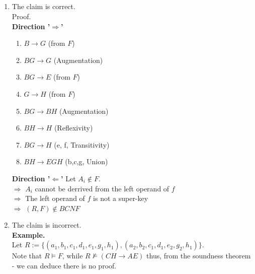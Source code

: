 \subsection{}
\begin{enumerate}
	\item
	The claim is correct.\\
		Proof.\\
		\textbf{Direction '$\Rightarrow$'}
		\begin{enumerate}
			\item $B\rightarrow G$ (from $F$)
			\item $BG\rightarrow G$ (Augmentation)
			\item $BG\rightarrow E$ (from $F$)
			\item $G\rightarrow H$ (from $F$)
			\item $BG\rightarrow BH$ (Augmentation)
			\item $BH\rightarrow H$ (Reflexivity)
			\item $BG\rightarrow H$ (e, f, Transitivity)
			\item $BH\rightarrow EGH$ (b,c,g, Union)
		\end{enumerate}
		\textbf{Direction '$\Leftarrow$'}
		Let $A_i\notin F$.\\
		$\Rightarrow$ $A_i$ cannot be derrived from the left operand of $f$\\
		$\Rightarrow$ The left operand of $f$ is not a super-key\\
		$\Rightarrow$ $(R,F)\notin BCNF$
	\item
	The claim is incorrect.\\
		\textbf{Example.}\\
		Let $R := \{(a_1, b_1, c_1, d_1, e_1, g_1, h_1), (a_2, b_2, c_1, d_1, e_2, g_2, h_1)\}$.\\
		Note that $R\models F$, while $R\not\models (CH\rightarrow AE)$ thus,
		from the soundness theorem - we can deduce there is no proof.
\end{enumerate}

